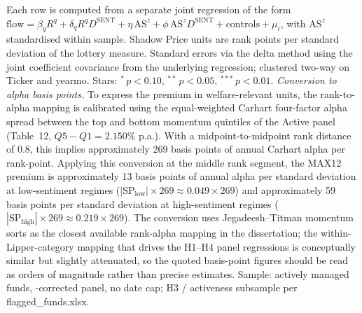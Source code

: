 \begin{table}[H]
{}
{\raggedright\noindent\footnotesize
\begin{singlespace}
Each row is computed from a separate joint regression of the form $\text{flow}=\beta_q R^q + \delta_q R^q D^{\text{SENT}} + \eta\,\text{AS}^z + \phi\,\text{AS}^z D^{\text{SENT}} + \text{controls} + \mu_i$, with $\text{AS}^z$ standardised within sample. Shadow Price units are rank points per standard deviation of the lottery measure. Standard errors via the delta method using the joint coefficient covariance from the underlying regression; clustered two-way on Ticker and yearmo. Stars: $^{*}\,p<0.10$, $^{**}\,p<0.05$, $^{***}\,p<0.01$. \smallskip \textit{Conversion to alpha basis points.} To express the premium in welfare-relevant units, the rank-to-alpha mapping is calibrated using the equal-weighted Carhart four-factor alpha spread between the top and bottom momentum quintiles of the Active panel (Table~12, $Q5-Q1=2.150\%$ p.a.). With a midpoint-to-midpoint rank distance of $0.8$, this implies approximately 269 basis points of annual Carhart alpha per rank-point. Applying this conversion at the middle rank segment, the MAX12 premium is approximately 13 basis points of annual alpha per standard deviation at low-sentiment regimes ($|\text{SP}_{\text{low}}|\times 269\approx 0.049\times 269$) and approximately 59 basis points per standard deviation at high-sentiment regimes ($|\text{SP}_{\text{high}}|\times 269\approx 0.219\times 269$). The conversion uses Jegadeesh--Titman momentum sorts as the closest available rank-alpha mapping in the dissertation; the within-Lipper-category mapping that drives the H1--H4 panel regressions is conceptually similar but slightly attenuated, so the quoted basis-point figures should be read as orders of magnitude rather than precise estimates. \smallskip Sample: actively managed funds, \textcite{Evans2010}-corrected panel, no date cap; H3 / activeness subsample per flagged\_funds.xlsx.
\end{singlespace}\par}
\end{table}
